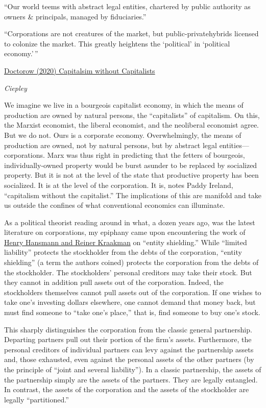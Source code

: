 \documentclass[
]{book}
\begin{document}
``Our world teems with abstract legal entities, chartered by public authority as owners \& principals, managed by fiduciaries.''

``Corporations are not creatures of the market, but public-privatehybrids licensed to colonize the market. This greatly heightens the `political' in `political economy.'\,''

\href{https://capitalaspower.com/2021/10/capitalism-without-capitalists/}{Doctorow (2020) Capitalsim without Capitalists}

\emph{Ciepley}

We imagine we live in a bourgeois capitalist economy, in which the means of production are owned by natural persons, the ``capitalists'' of capitalism. On this, the Marxist economist, the liberal economist, and the neoliberal economist agree. But we do not. Ours is a corporate economy. Overwhelmingly, the means of production are owned, not by natural persons, but by abstract legal entities---corporations. Marx was thus right in predicting that the fetters of bourgeois, individually-owned property would be burst asunder to be replaced by socialized property. But it is not at the level of the state that productive property has been socialized. It is at the level of the corporation. It is, notes Paddy Ireland, ``capitalism without the capitalist.'' The implications of this are manifold and take us outside the confines of what conventional economics can illuminate.

As a political theorist reading around in what, a dozen years ago, was the latest literature on corporations, my epiphany came upon encountering the work of \href{https://www.jstor.org/stable/4093574}{Henry Hansmann and Reiner Kraakman} on ``entity shielding.'' While ``limited liability'' protects the stockholder from the debts of the corporation, ``entity shielding'' (a term the authors coined) protects the corporation from the debts of the stockholder. The stockholders' personal creditors may take their stock. But they cannot in addition pull assets out of the corporation. Indeed, the stockholders themselves cannot pull assets out of the corporation. If one wishes to take one's investing dollars elsewhere, one cannot demand that money back, but must find someone to ``take one's place,'' that is, find someone to buy one's stock.

This sharply distinguishes the corporation from the classic general partnership. Departing partners pull out their portion of the firm's assets. Furthermore, the personal creditors of individual partners can levy against the partnership assets and, those exhausted, even against the personal assets of the other partners (by the principle of ``joint and several liability''). In a classic partnership, the assets of the partnership simply are the assets of the partners. They are legally entangled. In contrast, the assets of the corporation and the assets of the stockholder are legally ``partitioned.''
\end{document}
